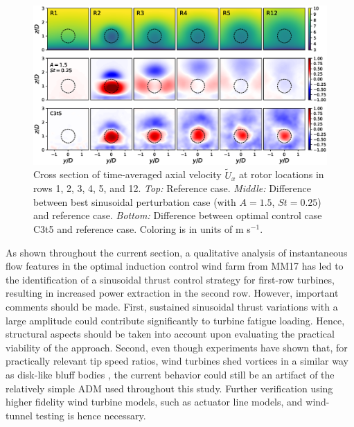 \documentclass[wes, manuscript]{copernicus}
\begin{document}
\begin{figure}
	\centering
	\includegraphics[width=\textwidth]{frontviews_allc3t5.eps}
	\caption{Cross section of time-averaged axial velocity $\widetilde{U}_x$ at rotor locations in rows 1, 2, 3, 4, 5, and 12. \emph{Top: } Reference case. \emph{Middle: } Difference between best sinusoidal perturbation case (with $A = 1.5$, $St = 0.25$) and reference case. \emph{Bottom: } Difference between optimal control case C3t5 and reference case. Coloring is in units of m s$^{-1}$. \label{fig:cross_section_sinus}}
\end{figure}

As shown throughout the current section, a qualitative analysis of instantaneous flow features in the optimal induction control wind farm from MM17 has led to the identification of a sinusoidal thrust control strategy for first-row turbines, resulting in increased power extraction in the second row. However, important comments should be made. First, sustained sinusoidal thrust variations with a large amplitude could contribute significantly to turbine fatigue loading. Hence, structural aspects should be taken into account upon evaluating the practical viability of the approach. Second, even though experiments have shown that, for practically relevant tip speed ratios, wind turbines shed vortices in a similar way as disk-like bluff bodies \citep{medici2006measurements}, the current behavior could still be an artifact of the relatively simple ADM used throughout this study. Further verification using higher fidelity wind turbine models, such as actuator line models, and wind-tunnel testing is hence necessary. 
\end{document}
